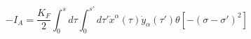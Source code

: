 \begin{equation}
\label{newlaw}
-I_A=\frac{K_F}{2}\int_0^sd\tau \int_0^{s'}d\tau' \dot{x}^{\alpha}(\tau )\dot{y}_{\alpha}(\tau')\theta [-(\sigma -\sigma')^2]
\end{equation}

